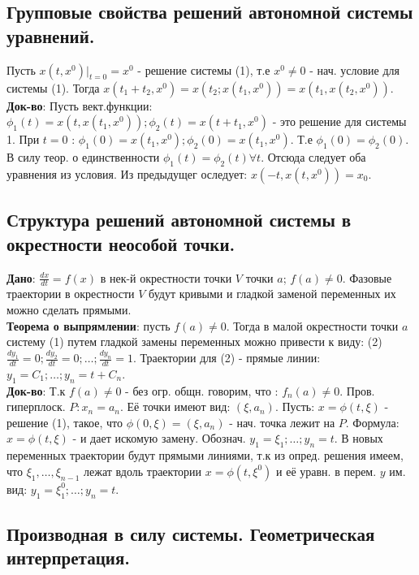 \documentclass[unicode, 8pt, a4paper,oneside, landscape]{article}
\begin{document}
\begin{multicols}{4}
\subsection{Групповые свойства решений автономной системы уравнений.}

Пусть $x(t, x^0)|_{t=0} = x^0$ - решение системы (1), т.е $x^0 \neq 0$ - нач. условие для системы (1). Тогда $x(t_1 + t_2, x^0) = x(t_2; x(t_1, x^0)) = x(t_1, x(t_2, x^0)).$\\ 
{\bf Док-во}: Пусть вект.функции: $\phi_1(t) = x(t, x(t_1, x^0)); \phi_2(t) = x(t + t_1, x^0)$ - это решение для системы 1. При $t = 0$ : $\phi_1(0) = x(t_1, x^0); \phi_2(0) = x(t_1, x^0)$. Т.е $\phi_1(0) = \phi_2(0)$. В силу теор. о единственности $\phi_1(t) = \phi_2(t) \forall t$. Отсюда следует оба уравнения из условия. Из предыдущег оследует: $x(-t, x(t, x^0)) = x_0$.

\subsection{Структура решений автономной системы в окрестности неособой точки.}

{\bf Дано}: $\frac{dx}{dt} = f(x)$ в нек-й окрестности точки $V$  точки $a$; $f(a) \neq 0$. Фазовые траектории в окрестности $V$ будут кривыми и гладкой заменой переменных их можно сделать прямыми.\\
{\bf Теорема о выпрямлении}: пусть $f(a) \neq 0$. Тогда в малой окрестности точки $a$ систему (1) путем гладкой замены переменных можно привести к виду: (2) $\frac{dy_1}{dt} = 0; \frac{dy_2}{dt} = 0; \ldots; \frac{dy_n}{dt} = 1$. Траектории для (2) - прямые линии: $y_1 = C_1; \ldots; y_n = t+C_n$.\\
{\bf Док-во}: Т.к $f(a) \neq 0$ - без огр. общн. говорим, что : $f_n(a) \neq 0$. Пров. гиперплоск. $P : x_n = a_n$. Её точки имеют вид: $(\xi, a_n)$. Пусть: $x = \phi(t, \xi)$ - решение (1), такое, что $\phi(0, \xi) = (\xi, a_n)$ - нач. точка лежит на $P$. Формула: $x = \phi(t, \xi)$ - и дает искомую замену. Обознач. $y_1 = \xi_1; \ldots; y_n = t$. В новых переменных траектории будут прямыми линиями, т.к из опред. решения имеем, что $\xi_1,\ldots, \xi_{n-1}$ лежат вдоль траектории $x = \phi(t, \xi^0)$ и её уравн. в перем. $y$ им. вид: $y_1 = \xi_1^0; \ldots; y_n = t$.

\subsection{Производная в силу системы. Геометрическая интерпретация.}


\end{multicols}
\end{document}
